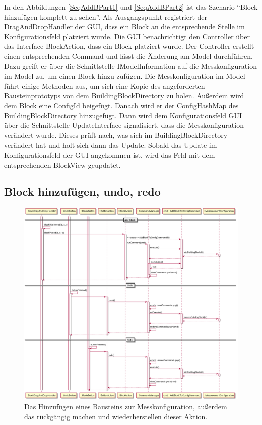 \documentclass[parskip=full]{scrartcl}
\begin{document}
In den Abbildungen \ref{SeqAddBPart1} und \ref{SeqAddBPart2} ist das Szenario "`Block hinzufügen komplett zu sehen"'. Als Ausgangspunkt registriert der DragAndDropHandler der GUI, dass ein Block an die entsprechende Stelle im Konfigurationsfeld platziert wurde. Die GUI benachrichtigt den Controller über das Interface BlockAction, dass ein Block platziert wurde. Der Controller erstellt einen entsprechenden Command und lässt die Änderung am Model durchführen. Dazu greift er über die Schnittstelle IModelInformation auf die Messkonfiguration im Model zu, um einen Block hinzu zufügen. Die Messkonfiguration im Model führt einige Methoden aus, um sich eine Kopie des angeforderten Bausteinprototyps von dem BuildingBlockDirectory zu holen. Außerdem wird dem Block eine ConfigId beigefügt. Danach wird er der ConfigHashMap des BuildingBlockDirectory hinzugefügt. Dann wird dem Konfigurationsfeld GUI über die Schnittstelle UpdateInterface signalisiert, dass die Messkonfiguration verändert wurde. Dieses prüft nach, was sich im BuildingBlockDirectory verändert hat und holt sich dann das Update. Sobald das Update im Konfigurationsfeld der GUI angekommen ist, wird das Feld mit dem entsprechenden BlockView geupdatet.

\subsection{Block hinzufügen, undo, redo}

\begin{figure}[htbp]
	\begin{center}
		\includegraphics[width = 16cm]{Grafiken/AddBlockSequence.png}
		\caption{Das Hinzufügen eines Bausteins zur Messkonfiguration, außerdem das rückgängig machen und wiederherstellen dieser Aktion.}
		\label{AddBlockSequence}
	\end{center}
\end{figure}
\end{document}
